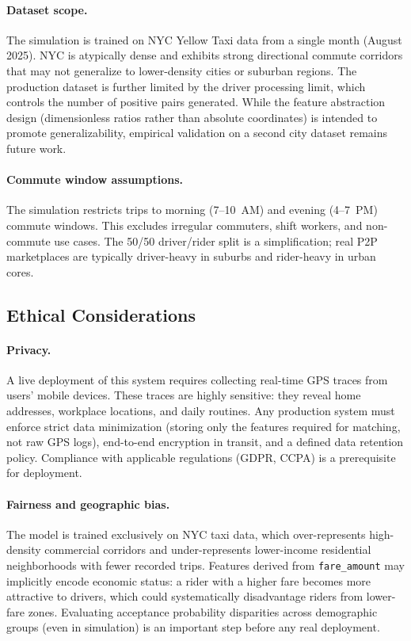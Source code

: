 \documentclass{article}
\begin{document}
\paragraph{Dataset scope.}
The simulation is trained on NYC Yellow Taxi data from a single month (August 2025). NYC is atypically dense and exhibits strong directional commute corridors that may not generalize to lower-density cities or suburban regions. The production dataset is further limited by the driver processing limit, which controls the number of positive pairs generated. While the feature abstraction design (dimensionless ratios rather than absolute coordinates) is intended to promote generalizability, empirical validation on a second city dataset remains future work.

\paragraph{Commute window assumptions.}
The simulation restricts trips to morning (7--10~AM) and evening (4--7~PM) commute windows. This excludes irregular commuters, shift workers, and non-commute use cases. The 50/50 driver/rider split is a simplification; real P2P marketplaces are typically driver-heavy in suburbs and rider-heavy in urban cores.

\subsection{Ethical Considerations}
\label{sec:ethics}

\paragraph{Privacy.}
A live deployment of this system requires collecting real-time GPS traces from users' mobile devices. These traces are highly sensitive: they reveal home addresses, workplace locations, and daily routines. Any production system must enforce strict data minimization (storing only the features required for matching, not raw GPS logs), end-to-end encryption in transit, and a defined data retention policy. Compliance with applicable regulations (GDPR, CCPA) is a prerequisite for deployment.

\paragraph{Fairness and geographic bias.}
The model is trained exclusively on NYC taxi data, which over-represents high-density commercial corridors and under-represents lower-income residential neighborhoods with fewer recorded trips. Features derived from \texttt{fare\_amount} may implicitly encode economic status: a rider with a higher fare becomes more attractive to drivers, which could systematically disadvantage riders from lower-fare zones. Evaluating acceptance probability disparities across demographic groups (even in simulation) is an important step before any real deployment.
\end{document}
